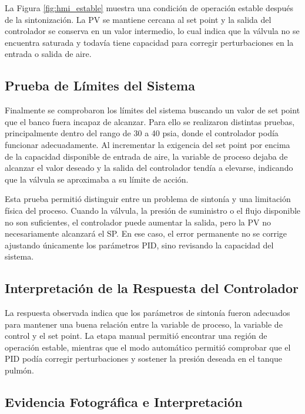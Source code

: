 \documentclass[12pt,letterpaper]{article}
\begin{document}
La Figura \ref{fig:hmi_estable} muestra una condición de operación estable después de la sintonización. La PV se mantiene cercana al set point y la salida del controlador se conserva en un valor intermedio, lo cual indica que la válvula no se encuentra saturada y todavía tiene capacidad para corregir perturbaciones en la entrada o salida de aire.

\subsection*{Prueba de Límites del Sistema}

Finalmente se comprobaron los límites del sistema buscando un valor de set point que el banco fuera incapaz de alcanzar. Para ello se realizaron distintas pruebas, principalmente dentro del rango de 30 a 40 psia, donde el controlador podía funcionar adecuadamente. Al incrementar la exigencia del set point por encima de la capacidad disponible de entrada de aire, la variable de proceso dejaba de alcanzar el valor deseado y la salida del controlador tendía a elevarse, indicando que la válvula se aproximaba a su límite de acción.

Esta prueba permitió distinguir entre un problema de sintonía y una limitación física del proceso. Cuando la válvula, la presión de suministro o el flujo disponible no son suficientes, el controlador puede aumentar la salida, pero la PV no necesariamente alcanzará el SP. En ese caso, el error permanente no se corrige ajustando únicamente los parámetros PID, sino revisando la capacidad del sistema.

\subsection*{Interpretación de la Respuesta del Controlador}

La respuesta observada indica que los parámetros de sintonía fueron adecuados para mantener una buena relación entre la variable de proceso, la variable de control y el set point. La etapa manual permitió encontrar una región de operación estable, mientras que el modo automático permitió comprobar que el PID podía corregir perturbaciones y sostener la presión deseada en el tanque pulmón.

\subsection*{Evidencia Fotográfica e Interpretación}
\end{document}
